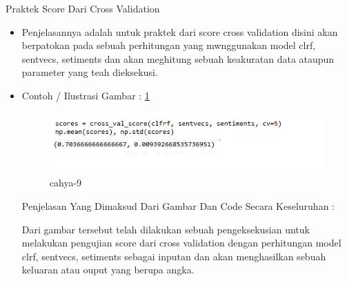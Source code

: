 \item Praktek Score Dari Cross Validation
\begin{itemize}
\item Penjelasannya adalah  untuk praktek dari score cross validation disini akan berpatokan pada sebuah perhitungan yang mwnggunakan model clrf, sentvecs, setiments dan  akan meghitung sebuah keakuratan data ataupun parameter yang teah dieksekusi.
\item Contoh / Ilustrasi Gambar : \ref{cahya-9}
\par
\begin{figure}[!hbtp]
\centering
\includegraphics[scale=0.3]{figures/cahya-9.jpg}
\caption{cahya-9}
\label{cahya-9}
\end{figure}
\par
\par Penjelasan Yang  Dimaksud Dari Gambar Dan Code Secara Keseluruhan : 
\par Dari gambar tersebut telah dilakukan sebuah pengeksekusian untuk melakukan pengujian score dari cross validation dengan  perhitungan model clrf, sentvecs, setiments sebagai inputan dan akan menghasilkan sebuah keluaran atau ouput yang berupa angka.
\par
\end{itemize}
\par

